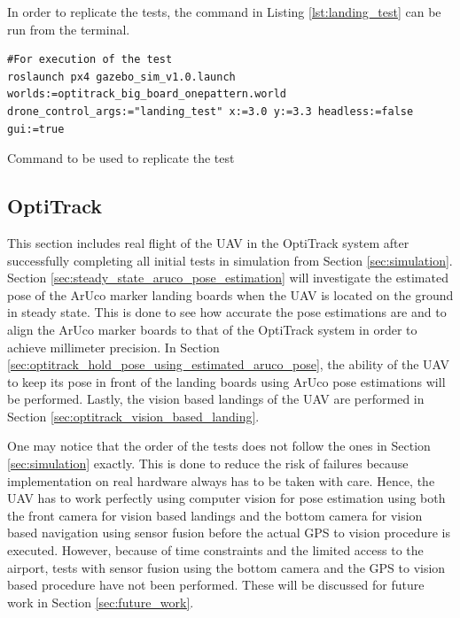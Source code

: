 \documentclass[../Head/report.tex]{subfiles}
\begin{document}
In order to replicate the tests, the command in Listing \ref{lst:landing_test} can be run from the terminal.

\begin{listing}[H] 
\begin{tcolorbox}[
    enhanced,
    attach boxed title to top left={xshift=6mm,yshift=-3mm},
    colback=lightgreen!20,
    colframe=lightgreen,
    fonttitle=\bfseries\color{black},
]
\begin{verbatim}
#For execution of the test
roslaunch px4 gazebo_sim_v1.0.launch worlds:=optitrack_big_board_onepattern.world drone_control_args:="landing_test" x:=3.0 y:=3.3 headless:=false gui:=true
\end{verbatim}
\end{tcolorbox}
\caption{Command to be used to replicate the test}
\label{lst:landing_test}    
\end{listing} 

\subsection{OptiTrack}
\label{sec:optitrack}

This section includes real flight of the UAV in the OptiTrack system after successfully completing all initial tests in simulation from Section \ref{sec:simulation}. Section \ref{sec:steady_state_aruco_pose_estimation} will investigate the estimated pose of the ArUco marker landing boards when the UAV is located on the ground in steady state. This is done to see how accurate the pose estimations are and to align the ArUco marker boards to that of the OptiTrack system in order to achieve millimeter precision. In Section \ref{sec:optitrack_hold_pose_using_estimated_aruco_pose}, the ability of the UAV to keep its pose in front of the landing boards using ArUco pose estimations will be performed. Lastly, the vision based landings of the UAV are performed in Section \ref{sec:optitrack_vision_based_landing}. 

One may notice that the order of the tests does not follow the ones in Section \ref{sec:simulation} exactly. This is done to reduce the risk of failures because implementation on real hardware always has to be taken with care. Hence, the UAV has to work perfectly using computer vision for pose estimation using both the front camera for vision based landings and the bottom camera for vision based navigation using sensor fusion before the actual GPS to vision procedure is executed. However, because of time constraints and the limited access to the airport, tests with sensor fusion using the bottom camera and the GPS to vision based procedure have not been performed. These will be discussed for future work in Section \ref{sec:future_work}.  
\end{document}
